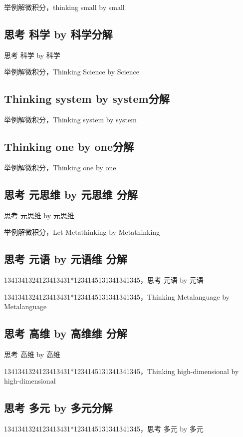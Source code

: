 \documentclass[12pt]{book}
\begin{document}
举例解微积分，thinking small by small

\subsection{思考 科学 by 科学分解}

思考 科学 by 科学

举例解微积分，Thinking Science by Science

\subsection{Thinking system by system分解}

举例解微积分，Thinking system by system

\subsection{Thinking one by one分解}

举例解微积分，Thinking one by one

\subsection{思考 元思维 by 元思维 分解}

思考 元思维 by 元思维 

举例解微积分，Let Metathinking by Metathinking




\subsection{思考 元语 by 元语维 分解}

1341341324123413431*1234145131341341345，思考 元语 by 元语

1341341324123413431*1234145131341341345，Thinking Metalanguage by Metalanguage

\subsection{思考 高维 by 高维维 分解}

思考 高维 by 高维

1341341324123413431*1234145131341341345，Thinking high-dimensional by high-dimensional

\subsection{思考 多元 by 多元分解}
1341341324123413431*1234145131341341345，思考 多元 by 多元
\end{document}
